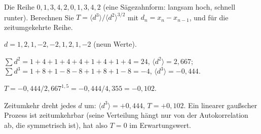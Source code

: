 \begin{aufgabe}
Die Reihe $0, 1, 3, 4, 2, 0, 1, 3, 4, 2$ (eine Sägezahnform: langsam hoch, schnell runter). Berechnen Sie $T = \langle d^{3}\rangle/\langle d^{2}\rangle^{3/2}$ mit $d_n = x_n - x_{n-1}$, und für die zeitumgekehrte Reihe.

\loesung
{}
$d = 1, 2, 1, -2, -2, 1, 2, 1, -2$ (neun Werte).

$\sum d^{2} = 1 + 4 + 1 + 4 + 4 + 1 + 4 + 1 + 4 = 24$, $\langle d^{2}\rangle = 2{,}667$; $\sum d^{3} = 1 + 8 + 1 - 8 - 8 + 1 + 8 + 1 - 8 = -4$, $\langle d^{3}\rangle = -0{,}444$.

$T = -0{,}444/2{,}667^{1{,}5} = -0{,}444/4{,}355 = -0{,}102$.

Zeitumkehr dreht jedes $d$ um: $\langle d^{3}\rangle = +0{,}444$, $T = +0{,}102$. Ein linearer gaußscher Prozess ist zeitumkehrbar (seine Verteilung hängt nur von der Autokorrelation ab, die symmetrisch ist), hat also $T = 0$ im Erwartungswert. \checkmark

\begin{center}
\begin{minipage}{0.88\textwidth}
\end{minipage}
\end{center}
\end{aufgabe}

